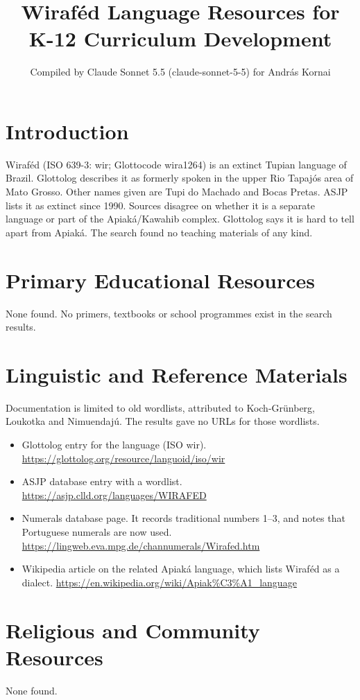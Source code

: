 \documentclass[12pt]{article}
\title{Wiraf\'ed Language Resources for K-12 Curriculum Development}
\author{Compiled by Claude Sonnet 5.5 (claude-sonnet-5-5) for Andr\'as Kornai}
\date{}
\begin{document}
\maketitle

\section{Introduction}
Wiraf\'ed (ISO 639-3: wir; Glottocode wira1264) is an extinct Tupian language of Brazil. Glottolog describes it as formerly spoken in the upper Rio Tapaj\'os area of Mato Grosso. Other names given are Tupi do Machado and Bocas Pretas. ASJP lists it as extinct since 1990. Sources disagree on whether it is a separate language or part of the Apiak\'a/Kawahib complex. Glottolog says it is hard to tell apart from Apiak\'a. The search found no teaching materials of any kind.

\section{Primary Educational Resources}
None found. No primers, textbooks or school programmes exist in the search results.

\section{Linguistic and Reference Materials}
Documentation is limited to old wordlists, attributed to Koch-Gr\"unberg, Loukotka and Nimuendaj\'u. The results gave no URLs for those wordlists.
\begin{itemize}
\item Glottolog entry for the language (ISO wir). \url{https://glottolog.org/resource/languoid/iso/wir}
\item ASJP database entry with a wordlist. \url{https://asjp.clld.org/languages/WIRAFED}
\item Numerals database page. It records traditional numbers 1--3, and notes that Portuguese numerals are now used. \url{https://lingweb.eva.mpg.de/channumerals/Wirafed.htm}
\item Wikipedia article on the related Apiak\'a language, which lists Wiraf\'ed as a dialect. \url{https://en.wikipedia.org/wiki/Apiak%C3%A1_language}
\end{itemize}

\section{Religious and Community Resources}
None found.
\end{document}
